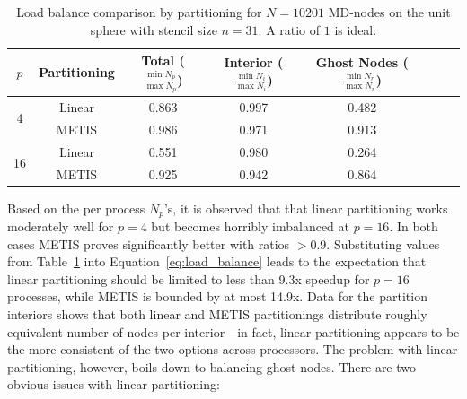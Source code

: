 \documentclass{report}
\begin{document}
\begin{table}
\centering
\caption{Load balance comparison by partitioning for $N=10201$ MD-nodes on the unit sphere with stencil size $n=31$. A ratio of $1$ is ideal.}
\label{tbl:load_balance}
\begin{tabular}{c|c|c|c|c|c|c|c}
$p$ & Partitioning & Total ($\frac{\min N_p}{\max N_p}$) &  Interior ($\frac{\min N_i}{\max N_i}$) & Ghost Nodes ($\frac{\min N_r}{\max N_r}$)  \\ \hline
\multirow{2}{*}{4} & Linear  &  0.863 & 0.997 & 0.482  \\
& METIS  & 0.986 & 0.971 & 0.913   \\ \hline
\multirow{2}{*}{16} & Linear &  0.551 & 0.980 & 0.264   \\
& METIS & 0.925 & 0.942 & 0.864  \\
\end{tabular}
\end{table}
%
Based on the per process $N_p$'s, it is observed that that linear partitioning works moderately well for $p=4$ but becomes horribly imbalanced at $p=16$. In both cases METIS proves significantly better with ratios $> 0.9$. Substituting values from Table~\ref{tbl:load_balance} into Equation~\ref{eq:load_balance} leads to the expectation that linear partitioning should be limited to less than 9.3x speedup for $p=16$ processes, while METIS is bounded by at most 14.9x. Data for the partition interiors shows that both linear and METIS partitionings distribute roughly equivalent number of nodes per interior---in fact, linear partitioning appears to be the more consistent of the two options across processors. The problem with linear partitioning, however, boils down to balancing ghost nodes. There are two obvious issues with linear partitioning:
\end{document}
